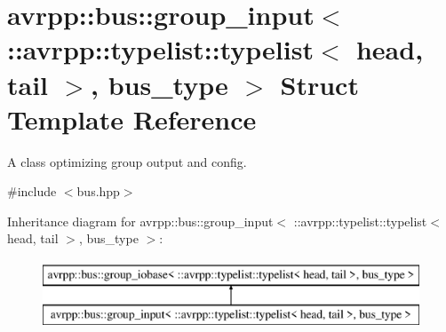 \hypertarget{structavrpp_1_1bus_1_1group__input_3_01_1_1avrpp_1_1typelist_1_1typelist_3_01head_00_01tail_01_4_00_01bus__type_01_4}{
\section{avrpp::bus::group\_\-input$<$ ::avrpp::typelist::typelist$<$ head, tail $>$, bus\_\-type $>$ Struct Template Reference}
\label{structavrpp_1_1bus_1_1group__input_3_01_1_1avrpp_1_1typelist_1_1typelist_3_01head_00_01tail_01_4_00_01bus__type_01_4}
}


A class optimizing group output and config.  




{\ttfamily \#include $<$bus.hpp$>$}

Inheritance diagram for avrpp::bus::group\_\-input$<$ ::avrpp::typelist::typelist$<$ head, tail $>$, bus\_\-type $>$:\begin{figure}[H]
\begin{center}
\leavevmode
\includegraphics[height=2.000000cm]{structavrpp_1_1bus_1_1group__input_3_01_1_1avrpp_1_1typelist_1_1typelist_3_01head_00_01tail_01_4_00_01bus__type_01_4}
\end{center}
\end{figure}
